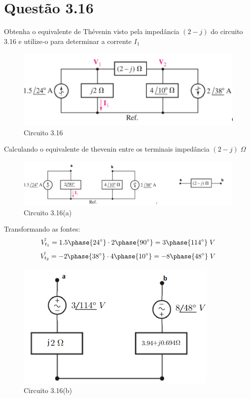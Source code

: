 \documentclass[
	12pt,				%
	oneside,			%
	a4paper,			%
	english,			%
	french,				%
	spanish,			%
	brazil				%
	]{abntex2}
\begin{document}

\section*{Questão 3.16} 

Obtenha o equivalente de Thévenin visto pela impedância $(2-j)$ do circuito 3.16 e utilize-o para determinar a corrente $I_1$

\begin{figure}[htb]
	\centering
	\includegraphics[scale=1]{3-16.PNG}
	\caption{Circuito 3.16}
\end{figure}

Calculando o equivalente de thevenin entre os terminais impedância $(2-j)\;\Omega$
\begin{figure}[htb]
	\centering
	\includegraphics[scale=0.6]{3-16(a).PNG}
	\caption{Circuito 3.16(a)}
\end{figure}

Transformando as fontes:
$$\hat{V_{t_1}} = {1.5 \phase{24^{\circ}}}\cdot{2 \phase{90^{\circ}}}={3 \phase{114^{\circ}}}\;V$$
$$\hat{V_{t_2}} = {-2 \phase{38^{\circ}}}\cdot{4 \phase{10^{\circ}}}={-8 \phase{48^{\circ}}}\;V$$

\begin{figure}[htb]
	\centering
	\includegraphics[scale=0.6]{3-16(b).PNG}
	\caption{Circuito 3.16(b)}
\end{figure}
\end{document}
